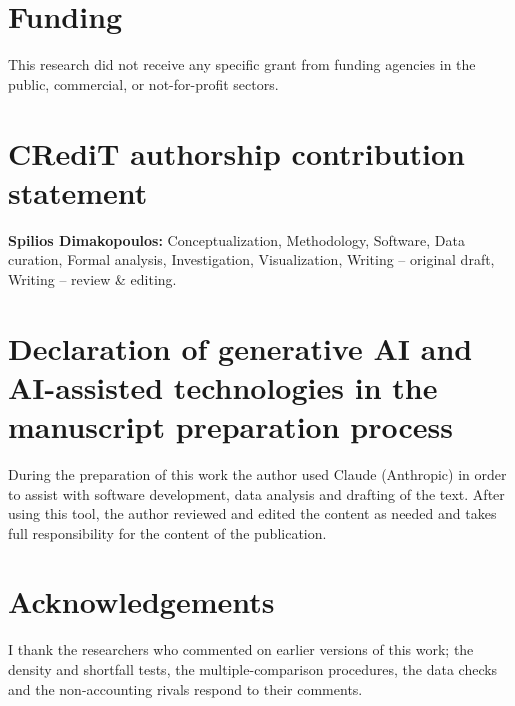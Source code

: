 \documentclass[preprint,12pt,authoryear]{elsarticle}
\newif\ifanon\anonfalse
\begin{document}
\section*{Funding}
This research did not receive any specific grant from funding agencies in the public, commercial, or not-for-profit sectors.

\section*{CRediT authorship contribution statement}
\textbf{Spilios Dimakopoulos:} Conceptualization, Methodology, Software, Data curation, Formal analysis, Investigation, Visualization, Writing -- original draft, Writing -- review \& editing.
\fi

\section*{Declaration of generative AI and AI-assisted technologies in the manuscript preparation process}
During the preparation of this work the author used Claude (Anthropic) in order to assist with software development, data analysis and drafting of the text. After using this tool, the author reviewed and edited the content as needed and takes full responsibility for the content of the publication.

\ifanon\else
\section*{Acknowledgements}
I thank the researchers who commented on earlier versions of this work; the density and shortfall tests, the multiple-comparison procedures, the data checks and the non-accounting rivals respond to their comments.
\fi




\appendix

\end{document}
